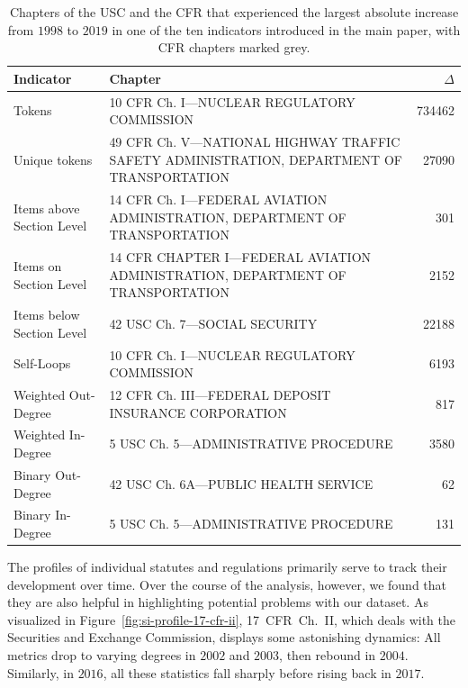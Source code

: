 \documentclass[utf8,sort&compress,numbers,square,table,hidelinks]{frontiers_suppmat} %
\begin{document}
\begin{table}
	\centering
	\small
	\caption{%
	Chapters of the USC and the CFR that experienced the largest absolute increase from $1998$ to $2019$ in one of the ten indicators introduced in the main paper, with CFR chapters marked grey.}\label{tab:si-profile-trends}
	\begin{tabular}{lp{}r}
		\toprule
		\textbf{Indicator}&\textbf{Chapter}&\textbf{$\Delta$}\\
		\midrule
		\rowcolor{lightgray!30}Tokens & 10 CFR Ch. I—NUCLEAR REGULATORY COMMISSION & 734462\\
		\rowcolor{lightgray!30}Unique tokens & 49 CFR Ch. V—NATIONAL HIGHWAY TRAFFIC SAFETY ADMINISTRATION, DEPARTMENT OF TRANSPORTATION & 27090\\\midrule
		\rowcolor{lightgray!30}Items above Section Level & 14 CFR Ch. I—FEDERAL AVIATION ADMINISTRATION, DEPARTMENT OF TRANSPORTATION & 301\\
		\rowcolor{lightgray!30}Items on Section Level & 14 CFR CHAPTER I—FEDERAL AVIATION ADMINISTRATION, DEPARTMENT OF TRANSPORTATION & 2152\\
		Items below Section Level & 42 USC Ch. 7—SOCIAL SECURITY & 22188\\\midrule
		\rowcolor{lightgray!30}Self-Loops & 10 CFR Ch. I—NUCLEAR REGULATORY COMMISSION & 6193\\\midrule
		\rowcolor{lightgray!30}Weighted Out-Degree & 12 CFR Ch. III—FEDERAL DEPOSIT INSURANCE CORPORATION & 817\\
		Weighted In-Degree & 5 USC Ch. 5—ADMINISTRATIVE PROCEDURE & 3580\\\midrule
		Binary Out-Degree & 42 USC Ch. 6A—PUBLIC HEALTH SERVICE & 62\\
		Binary In-Degree & 5 USC Ch. 5—ADMINISTRATIVE PROCEDURE & 131\\
		\bottomrule
	\end{tabular}
\end{table}

The profiles of individual statutes and regulations primarily serve to track their development over time.
Over the course of the analysis, however, we found that they are also helpful in highlighting potential problems with our dataset.
As visualized in Figure~\ref{fig:si-profile-17-cfr-ii},
17~CFR~Ch.~II, which deals with the Securities and Exchange Commission, displays some astonishing dynamics:
All metrics drop to varying degrees in $2002$ and $2003$, then rebound in $2004$.
Similarly, in $2016$, all these statistics fall sharply before rising back in $2017$.
\end{document}
